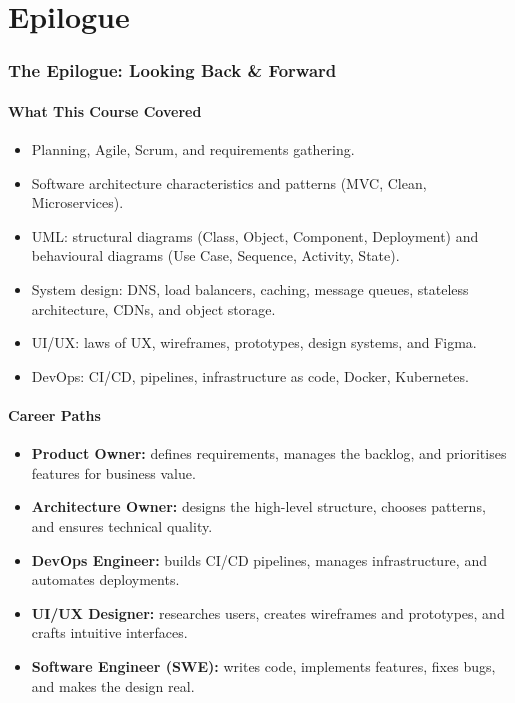 \documentclass[hidelinks]{article}
\begin{document}
\part{Epilogue}

\section{The Epilogue: Looking Back \& Forward}

\subsection{What This Course Covered}
\begin{itemize}
  \item Planning, Agile, Scrum, and requirements gathering.
  \item Software architecture characteristics and patterns (MVC, Clean, Microservices).
  \item UML: structural diagrams (Class, Object, Component, Deployment) and behavioural
        diagrams (Use Case, Sequence, Activity, State).
  \item System design: DNS, load balancers, caching, message queues, stateless architecture,
        CDNs, and object storage.
  \item UI/UX: laws of UX, wireframes, prototypes, design systems, and Figma.
  \item DevOps: CI/CD, pipelines, infrastructure as code, Docker, Kubernetes.
\end{itemize}

\subsection{Career Paths}
\begin{itemize}
  \item \textbf{Product Owner:} defines requirements, manages the backlog, and prioritises features
        for business value.
  \item \textbf{Architecture Owner:} designs the high-level structure, chooses patterns, and ensures
        technical quality.
  \item \textbf{DevOps Engineer:} builds CI/CD pipelines, manages infrastructure, and automates
        deployments.
  \item \textbf{UI/UX Designer:} researches users, creates wireframes and prototypes, and crafts
        intuitive interfaces.
  \item \textbf{Software Engineer (SWE):} writes code, implements features, fixes bugs, and makes the
        design real.
\end{itemize}
\end{document}
